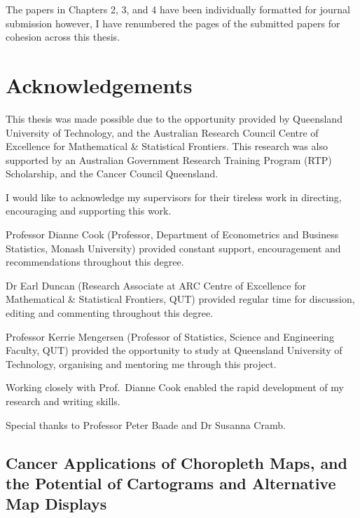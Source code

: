 \documentclass{monashthesis}
\begin{document}
The papers in Chapters 2, 3, and 4 have been individually formatted for journal submission however, I have renumbered the pages of the submitted papers for cohesion across this thesis.

\hypertarget{acknowledgements}{%
\chapter*{Acknowledgements}\label{acknowledgements}}

This thesis was made possible due to the opportunity provided by Queensland University of Technology, and the Australian Research Council Centre of Excellence for Mathematical \& Statistical Frontiers.
This research was also supported by an Australian Government Research Training Program (RTP) Scholarship, and the Cancer Council Queensland.

I would like to acknowledge my supervisors for their tireless work in directing, encouraging and supporting this work.

Professor Dianne Cook (Professor, Department of Econometrics and Business Statistics, Monash University) provided constant support, encouragement and recommendations throughout this degree.

Dr Earl Duncan (Research Associate at ARC Centre of Excellence for Mathematical \& Statistical Frontiers, QUT) provided regular time for discussion, editing and commenting throughout this degree.

Professor Kerrie Mengersen (Professor of Statistics, Science and Engineering Faculty, QUT) provided the opportunity to study at Queensland University of Technology, organising and mentoring me through this project.

Working closely with Prof.~Dianne Cook enabled the rapid development of my research and writing skills.

Special thanks to Professor Peter Baade and Dr Susanna Cramb.

\hypertarget{cancer-applications-of-choropleth-maps-and-the-potential-of-cartograms-and-alternative-map-displays}{%
\section*{Cancer Applications of Choropleth Maps, and the Potential of Cartograms and Alternative Map Displays}\label{cancer-applications-of-choropleth-maps-and-the-potential-of-cartograms-and-alternative-map-displays}}
\end{document}

